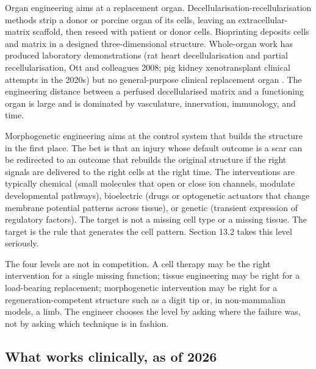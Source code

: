  Organ engineering aims at a
replacement organ. Decellularisation-recellularisation methods strip a
donor or porcine organ of its cells, leaving an extracellular-matrix
scaffold, then reseed with patient or donor cells. Bioprinting deposits
cells and matrix in a designed three-dimensional structure. Whole-organ
work has produced laboratory demonstrations (rat heart decellularisation
and partial recellularisation, Ott and colleagues 2008; pig kidney
xenotransplant clinical attempts in the 2020s) but no general-purpose
clinical replacement organ \cite{paper:v6c13-ott-decell-2008}. The
engineering distance between a perfused decellularised matrix and a
functioning organ is large and is dominated by vasculature,
innervation, immunology, and time.

 Morphogenetic engineering aims at
the control system that builds the structure in the first place. The
bet is that an injury whose default outcome is a scar can be redirected
to an outcome that rebuilds the original structure if the right signals
are delivered to the right cells at the right time. The interventions
are typically chemical (small molecules that open or close ion
channels, modulate developmental pathways), bioelectric (drugs or
optogenetic actuators that change membrane potential patterns across
tissue), or genetic (transient expression of regulatory factors). The
target is not a missing cell type or a missing tissue. The target is
the rule that generates the cell pattern. Section 13.2 takes this
level seriously.

The four levels are not in competition. A cell therapy may be the right
intervention for a single missing function; tissue engineering may be
right for a load-bearing replacement; morphogenetic intervention may be
right for a regeneration-competent structure such as a digit tip or, in
non-mammalian models, a limb. The engineer chooses the level by asking
where the failure was, not by asking which technique is in fashion.

\subsection{What works clinically, as of 2026}


